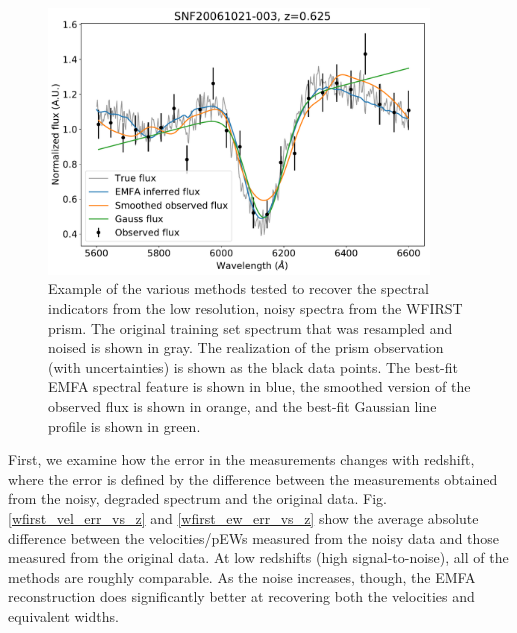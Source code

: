 \begin{figure}[!htb]
    \centering
    \includegraphics[width=0.9\textwidth]{figures/si_feat_pca/example_wfirst_emfa_recovery.pdf}
    \caption{Example of the various methods tested to recover the spectral indicators from the low resolution, noisy spectra from the WFIRST prism. The original training set spectrum that was resampled and noised is shown in gray. The realization of the prism observation (with uncertainties) is shown as the black data points. The best-fit EMFA spectral feature is shown in blue, the smoothed version of the observed flux is shown in orange, and the best-fit Gaussian line profile is shown in green.}
    \label{example_wfirst_recovery}
\end{figure}

First, we examine how the error in the measurements changes with redshift, where the error is defined by the difference between the measurements obtained from the noisy, degraded spectrum and the original data. Fig. \ref{wfirst_vel_err_vs_z} and \ref{wfirst_ew_err_vs_z} show the average absolute difference between the velocities/pEWs measured from the noisy data and those measured from the original data. At low redshifts (high signal-to-noise), all of the methods are roughly comparable. As the noise increases, though, the EMFA reconstruction does significantly better at recovering both the velocities and equivalent widths.

